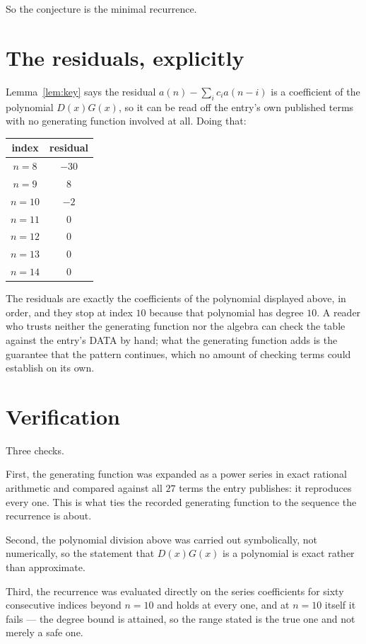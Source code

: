 \documentclass[11pt,a4paper]{article}
\theoremstyle{plain}
\theoremstyle{definition}
\begin{document}
So the conjecture is the minimal recurrence.

\section{The residuals, explicitly}

Lemma~\ref{lem:key} says the residual $a(n)-\sum_ic_ia(n-i)$ is a coefficient of the
polynomial $D(x)G(x)$, so it can be read off the entry's own published terms with no
generating function involved at all. Doing that:
\begin{center}
\begin{tabular}{cc}
index & residual \\ \hline
$n=8$ & $-30$ \\
$n=9$ & $8$ \\
$n=10$ & $-2$ \\
$n=11$ & $0$ \\
$n=12$ & $0$ \\
$n=13$ & $0$ \\
$n=14$ & $0$
\end{tabular}
\end{center}
The residuals are exactly the coefficients of the polynomial displayed above, in order, and
they stop at index $10$ because that polynomial has degree $10$. A reader who trusts
neither the generating function nor the algebra can check the table against the entry's DATA
by hand; what the generating function adds is the guarantee that the pattern continues, which
no amount of checking terms could establish on its own.

\section{Verification}

Three checks.

First, the generating function was expanded as a power series in exact rational arithmetic and
compared against all $27$ terms the entry publishes: it reproduces every one. This is
what ties the recorded generating function to the sequence the recurrence is about.

Second, the polynomial division above was carried out symbolically, not numerically, so the
statement that $D(x)G(x)$ is a polynomial is exact rather than approximate.

Third, the recurrence was evaluated directly on the series coefficients for sixty consecutive
indices beyond $n=10$ and holds at every one, and at $n=10$ itself it fails --- the
degree bound is attained, so the range stated is the true one and not merely a safe one.
\end{document}
